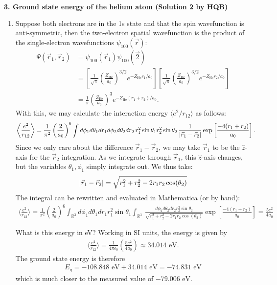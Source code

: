 \documentclass{article}
\theoremstyle{definition}
\newcommand{\f}[2]{\frac{#1}{#2}}
\newcommand{\lp}{\left(}
\newcommand{\rp}{\right)}
\newcommand{\lb}{\left[}
\newcommand{\rb}{\right]}
\begin{document}
\noindent \textbf{3. Ground state energy of the helium atom (Solution 2 by HQB)}


\begin{enumerate}[label=(\alph*)]
	\item Suppose both electrons are in the 1s state and that the spin wavefunction is anti-symmetric, then the two-electron spatial wavefunction is the product of the single-electron wavefunctions $\psi_{100}(\vec{r})$:
	\begin{align*}
	\Psi(\vec{r}_1, \vec{r}_2) 
	&= \psi_{100}(\vec{r}_1)\psi_{100}(\vec{2})\\
	&= \lb \f{1}{\sqrt{\pi}} \lp \f{Z_\text{He}}{a_0} \rp^{3/2}  e^{-Z_\text{He} r_1/a_0}\rb 
	\lb \f{1}{\sqrt{\pi}} \lp \f{Z_\text{He}}{a_0} \rp^{3/2}  e^{-Z_\text{He} r_2/a_0} \rb\\
	&= \f{1}{\pi} \lp \f{Z_\text{He}}{a_0} \rp^3 e^{-Z_\text{He}(r_1 + r_2)/a_0}.
	\end{align*}
	With this, we may calculate the interaction energy $\langle e^2/r_{12}\rangle$ as follows: 
	\begin{align*}
	\bigg\langle \f{e^2}{r_{12}}\bigg\rangle 
	&= \f{1}{\pi^2}\lp \f{2}{a_0} \rp^6 \int d\phi_1 d\theta_1 dr_1    d\phi_2 d\theta_2 dr_2 \, r_1^2\sin\theta_1  r_2^2\sin\theta_2 \, \f{1}{\abs{\vec{r}_1 - \vec{r}_2}}\exp\lb \f{-4 (r_1 + r_2)}{a_0} \rb.
	\end{align*}
	Since we only care about the difference $\vec{r}_1 - \vec{r}_2$, we may take $\vec{r}_1$ to be the $\hat z$-axis for the $\vec{r}_2$ integration. As we integrate through $\vec{r}_1$, this $\hat{z}$-axis changes, but the variables $\theta_1,\phi_1$ simply integrate out. We thus take:
	\begin{align*}
	\abs{\vec{r}_1 - \vec{r}_2} = \sqrt{r_1^2 + r_2^2 - 2r_1r_2\cos(\theta_2)} 
	\end{align*}
	The integral can be rewritten and evaluated in Mathematica (or by hand):
	\begin{align*}
	\bigg\langle \f{e^2}{r_{12}}\bigg\rangle 
	= \f{1}{\pi^2}\lp \f{2}{a_0} \rp^6  \int_{\mathbb{R}^3} d\phi_1 d\theta_1 dr_1 r_1^2\sin\theta_1  \int_{\mathbb{R}^3}   \, 
	\f{d\phi_2 d\theta_2 dr_2 r_2^2\sin\theta_2}{\sqrt{r_1^2 + r_2^2 - 2r_1r_2\cos(\theta_2)}}\exp\lb \f{-4 (r_1 + r_2)}{a_0} \rb
	= \boxed{\f{5e^2}{4a_0}}
	\end{align*}  
	
	What is this energy in eV? Working in SI units, the energy is given by 
	\begin{align*}
	\bigg\langle \f{e^2}{r_{12}}\bigg\rangle = \f{1}{4\pi \epsilon_0} \lp \f{5e^2}{4a_0} \rp \approx 34.014 \text{ eV}. 
	\end{align*}
	The ground state energy is therefore 
	\begin{align*}
	E_g = -108.848 \text{ eV} + 34.014 \text{ eV} = \boxed{-74.831 \text{ eV}}
	\end{align*}
	which is much closer to the measured value of $-79.006 \text{ eV}$.
	

\end{enumerate}
\end{document}
